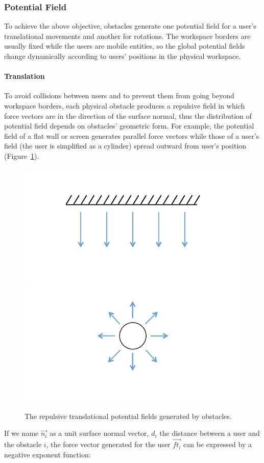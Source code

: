\subsubsection{Potential Field}
To achieve the above objective, obstacles generate one potential field for a user's translational movements and another for rotations. The workspace borders are usually fixed while the users are mobile entities, so the global potential fields change dynamically according to users' positions in the physical workspace.

\paragraph{Translation}
To avoid collisions between users and to prevent them from going beyond workspace borders, each physical obstacle produces a repulsive field in which force vectors are in the direction of the surface normal, thus the distribution of potential field depends on obstacles' geometric form. For example, the potential field of a flat wall or screen generates parallel force vectors while those of a user's field (the user is simplified as a cylinder) spread outward from user's position (Figure~\ref{fig:5_pf_t}).

\begin{figure}[htb]
  \centering
  \includegraphics[width=.49\textwidth]{figures/ch5/pf_t_wall}
  \includegraphics[width=.49\textwidth]{figures/ch5/pf_t_user}
  \caption{\label{fig:5_pf_t}The repulsive translational potential fields generated by obstacles.}
\end{figure}

If we name $\overrightarrow{n_{i}}$ as a unit surface normal vector, $d_{i}$ the distance between a user and the obstacle $i$, the force vector generated for the user $\overrightarrow{ft_{i}}$ can be expressed by a negative exponent function:

